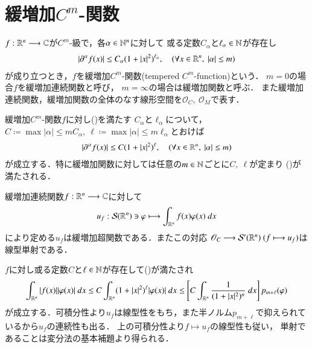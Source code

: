 \section{緩増加$C^m$-関数}
	\begin{screen}
		\begin{dfn}[緩増加$C^m$-関数]
			$f:\mathbb{R}^n \longrightarrow \mathbb{C}$が$C^m$-級で，各$\alpha \in \mathbb{N}^n$に対して
			或る定数$C_\alpha$と$\ell_\alpha \in \mathbb{N}$が存在し
			\begin{align}
				\left| \partial^\alpha f(x) \right| \leq C_\alpha(1+|x|^2)^{\ell_\alpha},
				\quad (\forall x \in \mathbb{R}^n,\ |\alpha| \leq m)
				\label{eq:tempered_c^m_function}
			\end{align}
			が成り立つとき，$f$を緩増加$C^m$-関数(tempered $C^m$-function)という．
			$m=0$の場合$f$を緩増加連続関数と呼び，
			$m=\infty$の場合は緩増加関数と呼ぶ．
			また緩増加連続関数，緩増加関数の全体のなす線形空間を$\mathscr{O}_C,\ \mathscr{O}_M$で表す．
		\end{dfn}
	\end{screen}
	
	緩増加$C^m$-関数$f$に対し()を満たす
	$C_\alpha$と$\ell_\alpha$について，
	$C \coloneqq \max{|\alpha| \leq m}{C_\alpha}
	,\ \ell \coloneqq \max{|\alpha| \leq m}{\ell_\alpha}$とおけば
	\begin{align}
		\left| \partial^\alpha f(x) \right| \leq C(1+|x|^2)^\ell,
		\quad (\forall x \in \mathbb{R}^n,\ |\alpha| \leq m)
		\label{eq:tempered_c^m_function_2}
	\end{align}
	が成立する．特に緩増加関数に対しては任意の$m \in \mathbb{N}$ごとに$C,\ \ell$が定まり
	()が満たされる．
	
	\begin{screen}
		\begin{thm}[緩増加連続関数により定まる緩増加超関数]
		\label{thm:tempered_continuous_functions_and_tempered_distributions}
			緩増加連続関数$f:\mathbb{R}^n \longrightarrow \mathbb{C}$に対して
			\begin{align}
				u_f: \mathcal{S}(\mathbb{R}^n) \ni \varphi \longmapsto
				\int_{\mathbb{R}^n} f(x) \varphi(x)\ dx
			\end{align}
			により定める$u_f$は緩増加超関数である．またこの対応
			$\mathscr{O}_C \longrightarrow \mathcal{S}'(\mathbb{R}^n)\ (f \longmapsto u_f)$は
			線型単射である．
		\end{thm}
	\end{screen}
	
	\begin{prf}
		$f$に対し或る定数$C$と$\ell \in \mathbb{N}$が存在して()が満たされ
		\begin{align}
			\int_{\mathbb{R}^n} |f(x)| |\varphi(x)|\ dx
			\leq C \int_{\mathbb{R}^n} (1+|x|^2)^\ell |\varphi(x)|\ dx
			\leq \left[ C \int_{\mathbb{R}^n} \frac{1}{(1+|x|^2)^n}\ dx \right] p_{m+\ell}(\varphi) 
		\end{align}
		が成立する．可積分性より$u_f$は線型性をもち，また半ノルム$p_{m+\ell}$で抑えられているから$u_f$の連続性も出る．
		上の可積分性より$f \longmapsto u_f$の線型性も従い，
		単射であることは変分法の基本補題より得られる．
		\QED
	\end{prf}
